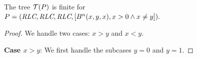 \begin{lemma}
\label{lemma:b}
The tree $\mathcal{T}(P)$ is finite for \\$P=(\textit{RLC}, \textit{RLC}, \textit{RLC}, [B^n(x, y, x), 
  x>0 \wedge x \neq y]).$

\end{lemma}
\begin{proof}
We handle two cases: $x>y$ and $x<y$.

\noindent \textbf{Case $x>y$}:
  We first handle the subcases $y=0$ and $y=1$.


\end{proof}
